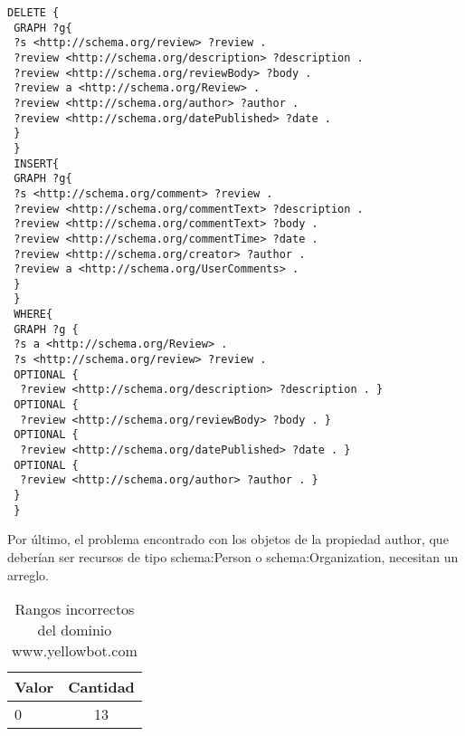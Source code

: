 \begin{lstlisting}[frame=single]
 DELETE { 
 GRAPH ?g{ 
 ?s <http://schema.org/review> ?review .
 ?review <http://schema.org/description> ?description .
 ?review <http://schema.org/reviewBody> ?body .
 ?review a <http://schema.org/Review> .
 ?review <http://schema.org/author> ?author . 
 ?review <http://schema.org/datePublished> ?date .
 } 
 } 
 INSERT{ 
 GRAPH ?g{ 
 ?s <http://schema.org/comment> ?review .
 ?review <http://schema.org/commentText> ?description .
 ?review <http://schema.org/commentText> ?body .
 ?review <http://schema.org/commentTime> ?date .
 ?review <http://schema.org/creator> ?author .
 ?review a <http://schema.org/UserComments> .
 }
 }
 WHERE{
 GRAPH ?g {
 ?s a <http://schema.org/Review> .
 ?s <http://schema.org/review> ?review .
 OPTIONAL {
  ?review <http://schema.org/description> ?description . }
 OPTIONAL {
  ?review <http://schema.org/reviewBody> ?body . }
 OPTIONAL {
  ?review <http://schema.org/datePublished> ?date . }
 OPTIONAL {
  ?review <http://schema.org/author> ?author . }
 }
 }
\end{lstlisting}

Por último, el problema encontrado con los objetos de la propiedad author, que deberían ser recursos de tipo schema:Person o schema:Organization, 
necesitan un arreglo.


\begin{table}[h]
\begin{tabular}{| l | c |}\hline
 Valor & Cantidad\\\hline
 0 & 13\\\hline
\end{tabular}
\caption{Rangos incorrectos del dominio www.yellowbot.com}
\label{table:YellowBot}
\end{table}

